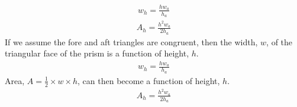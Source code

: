 \documentclass[letterpaper,10pt,english]{sphinxmanual}
\begin{document}
\begin{sphinxVerbatim}[commandchars=\\\{\}]
        

     
    

       
\end{sphinxVerbatim}
\begin{equation*}
\begin{split}\displaystyle w_{h} = \frac{h w_{a}}{h_{a}}\end{split}
\end{equation*}\begin{equation*}
\begin{split}\displaystyle A_{h} = \frac{h^{2} w_{a}}{2 h_{a}}\end{split}
\end{equation*}
\sphinxAtStartPar
If we assume the fore and aft triangles are congruent, then the width, \(w\), of the triangular face of the prism is a function of height, \(h\).
\begin{equation}\label{equation:index:width_from_height}
\begin{split}\displaystyle w_{h} = \frac{h w_{a}}{h_{a}}\end{split}
\end{equation}
\sphinxAtStartPar
Area, \(A = \frac{1}{2} \times w \times h\), can then become a function of height, \(h\).
\begin{equation}\label{equation:index:area_from_height}
\begin{split}\displaystyle A_{h} = \frac{h^{2} w_{a}}{2 h_{a}}\end{split}
\end{equation}
\end{document}
